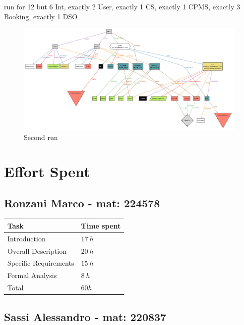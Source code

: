 \documentclass[11pt]{article}
\begin{document}
\begin{ffcode}
run {} for 12 but 6 Int, exactly 2 User, exactly 1 CS, exactly 1 CPMS, exactly 3 Booking, exactly 1 DSO
\end{ffcode}

\begin{figure}[!ht]
    \centering
    \includegraphics[width=190mm]{Alloy_1.png}
    \caption{Second run}
    \label{fig:my_label}
\end{figure}

\newpage

\section{Effort Spent}
\label{section:effort}

\subsection{Ronzani Marco - mat: 224578}

\begin{tabular}{|l|l|}
    \hline
    \textbf{Task} & \textbf{Time spent} \\
    \hline
    Introduction & $17\ h$ \\
    \hline
    Overall Description & $20\ h$ \\
    \hline
    Specific Requirements & $15\ h$ \\
    \hline
    Formal Analysis & $8\ h$ \\
    \hline
    \hline
    Total & $60 h$ \\
    \hline
\end{tabular}

\subsection{Sassi Alessandro - mat: 220837}
\end{document}
